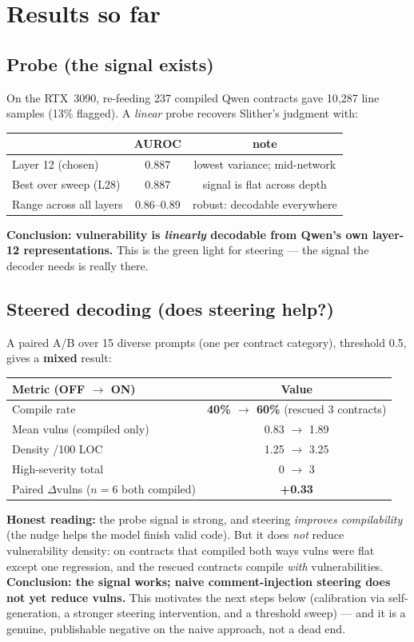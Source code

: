 \documentclass[11pt]{article}
\begin{document}
\section{Results so far}
\subsection*{Probe (the signal exists)}
On the RTX~3090, re-feeding 237 compiled Qwen contracts gave 10{,}287 line
samples (13\% flagged). A \emph{linear} probe recovers Slither's judgment with:
\begin{center}
\begin{tabular}{@{}lcc@{}}
\toprule
 & \textbf{AUROC} & \textbf{note} \\
\midrule
Layer 12 (chosen) & 0.887 & lowest variance; mid-network \\
Best over sweep (L28) & 0.887 & signal is flat across depth \\
Range across all layers & 0.86--0.89 & robust: decodable everywhere \\
\bottomrule
\end{tabular}
\end{center}
\noindent \textbf{Conclusion: vulnerability is \emph{linearly} decodable from
Qwen's own layer-12 representations.} This is the green light for steering ---
the signal the decoder needs is really there.

\subsection*{Steered decoding (does steering help?)}
A paired A/B over 15 diverse prompts (one per contract category), threshold
0.5, gives a \textbf{mixed} result:
\begin{center}
\begin{tabular}{@{}lc@{}}
\toprule
\textbf{Metric (OFF $\rightarrow$ ON)} & \textbf{Value} \\
\midrule
Compile rate & \textbf{40\% $\rightarrow$ 60\%} \quad(rescued 3 contracts) \\
Mean vulns (compiled only) & 0.83 $\rightarrow$ 1.89 \\
Density /100 LOC & 1.25 $\rightarrow$ 3.25 \\
High-severity total & 0 $\rightarrow$ 3 \\
Paired $\Delta$vulns ($n=6$ both compiled) & \textbf{+0.33} \\
\bottomrule
\end{tabular}
\end{center}
\noindent \textbf{Honest reading:} the probe signal is strong, and steering
\emph{improves compilability} (the nudge helps the model finish valid code). But
it does \emph{not} reduce vulnerability density: on contracts that compiled both
ways vulns were flat except one regression, and the rescued contracts compile
\emph{with} vulnerabilities. \textbf{Conclusion: the signal works; naive
comment-injection steering does not yet reduce vulns.} This motivates the next
steps below (calibration via self-generation, a stronger steering intervention,
and a threshold sweep) --- and it is a genuine, publishable negative on the
naive approach, not a dead end.
\end{document}

